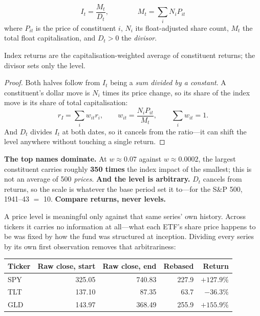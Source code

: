 \begin{definition}[Index]\label{def:index}
\[
  I_t = \frac{M_t}{D_t}, \qquad\qquad M_t = \sum_i N_i P_{it}
\]
where $P_{it}$ is the price of constituent $i$, $N_i$ its float-adjusted share count, $M_t$ the
total float capitalisation, and $D_t > 0$ the \emph{divisor}.
\end{definition}

\begin{claim}\label{clm:index-returns}
Index returns are the capitalisation-weighted average of constituent returns; the divisor sets only
the level.
\end{claim}

\begin{proof}
Both halves follow from $I_t$ being a \emph{sum divided by a constant}. A constituent's dollar move
is $N_i$ times its price change, so its share of the index move is its share of total
capitalisation:
\[
  r_I = \sum_i w_{it} r_i, \qquad w_{it} = \frac{N_i P_{it}}{M_t}, \qquad \sum_i w_{it} = 1 .
\]
And $D_t$ divides $I_t$ at both dates, so it cancels from the ratio---it can shift the level
anywhere without touching a single return.
\end{proof}

\begin{note}
\textbf{The top names dominate.} At $w \approx 0.07$ against $w \approx 0.0002$, the largest
constituent carries roughly \textbf{350 times} the index impact of the smallest; this is not an
average of 500 \emph{prices}. \textbf{And the level is arbitrary.} $D_t$ cancels from returns, so
the scale is whatever the base period set it to---for the S\&P 500, 1941--43 $=$ 10.
\textbf{Compare returns, never levels.}
\end{note}

A price level is meaningful only against that same series' own history. Across tickers it carries no
information at all---what each ETF's share price happens to be was fixed by how the fund was
structured at inception. Dividing every series by its own first observation removes that
arbitrariness:

\begin{center}
\begin{tabular}{|l|r|r|r|r|}
\hline
\textbf{Ticker} & \textbf{Raw close, start} & \textbf{Raw close, end} & \textbf{Rebased} & \textbf{Return} \\ \hline
SPY & 325.05 & 740.83 & 227.9 & \textbf{$+127.9\%$} \\ \hline
TLT & 137.10 &  87.35 &  63.7 & \textbf{$-36.3\%$}  \\ \hline
GLD & 143.97 & 368.49 & 255.9 & \textbf{$+155.9\%$} \\ \hline
\end{tabular}
\end{center}

